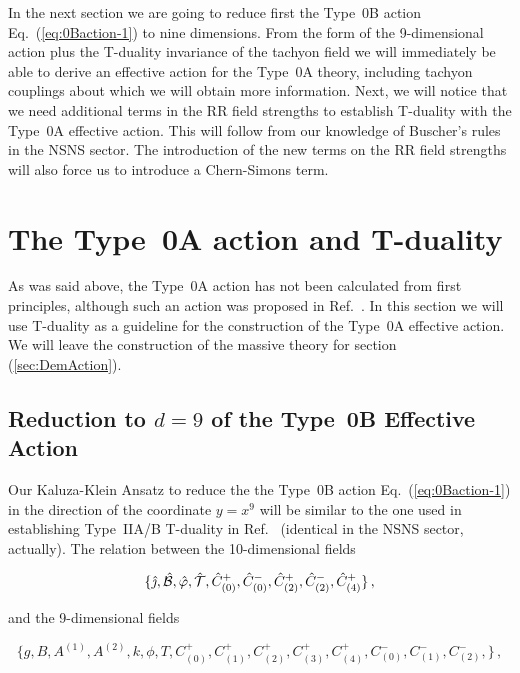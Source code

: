 \documentclass[12pt,a4paper]{article}
\begin{document}
In the next section we are going to reduce first the Type~0B
action Eq.~(\ref{eq:0Baction-1}) to nine dimensions. From the form of
the 9-dimensional action plus the T-duality invariance of the tachyon
field we will immediately be able to derive an effective action for
the Type~0A theory, including tachyon couplings about which we will
obtain more information. Next, we will notice that we need additional
terms in the RR field strengths to establish T-duality with the
Type~0A effective action. This will follow from our knowledge of
Buscher's rules in the NSNS sector.  The introduction of the new terms
on the RR field strengths will also force us to introduce a
Chern-Simons term.

\section{The Type~0A action and T-duality}
\label{sec:type0-9d}
As was said above, the Type~0A action has not been calculated from
first principles, although such an action was proposed in
Ref.~\cite{kn:FKM}. In this section we will use T-duality as a
guideline for the construction of the Type~0A effective action.  We
will leave the construction of the massive theory for section
(\ref{sec:DemAction}).
%
\subsection{Reduction to $d=9$ of the Type~0B Effective Action}
%
Our Kaluza-Klein Ansatz to reduce the the Type~0B action
Eq.~(\ref{eq:0Baction-1}) in the direction of the coordinate $y=x^{9}$
will be similar to the one used in establishing Type~IIA/B T-duality
in Ref.~\cite{kn:MO} (identical in the NSNS sector, actually). The
relation between the 10-dimensional fields

\begin{equation}
\{\hat{\jmath},
\hat{\cal B},\hat{\varphi},\hat{\cal T}, 
\hat{C}^{+}_{(0)},\hat{C}^{-}_{(0)},\hat{C}^{+}_{(2)},
\hat{C}^{-}_{(2)},\hat{C}^{+}_{(4)}\}\, ,
\end{equation}

\noindent and the 9-dimensional fields 

\begin{equation}
\{g,B,A^{(1)},A^{(2)},k,\phi,T,
C^{+}_{(0)},C^{+}_{(1)},C^{+}_{(2)},C^{+}_{(3)},C^{+}_{(4)},
C^{-}_{(0)},C^{-}_{(1)},C^{-}_{(2)},\}\, ,  
\end{equation}
\end{document}
